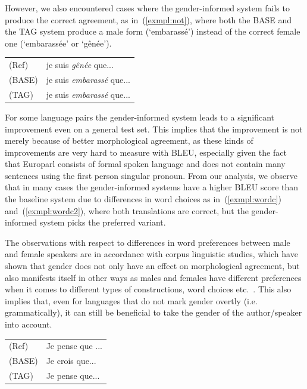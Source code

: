However, we also encountered cases where the gender-informed system fails to produce the correct agreement, as in~(\ref{exmpl:not}), where both the BASE and the TAG system produce a male form (`embarass\'e') instead of the correct female one (`embarass\'ee' or `g\^{e}n\'{e}e'). 

\begin{li}
{\small \centering
\begin{tabular}{ll}
(Ref) & je suis \emph{g\^en\'{e}e} que...\\
(BASE) & je suis \emph{embarass\'{e}} que...\\
(TAG) & je suis \emph{embarass\'{e}} que...\\
\end{tabular}}\label{exmpl:not}
\end{li}

For some language pairs the gender-informed system leads to a significant improvement even on a general test set. This implies that the improvement is not merely because of better morphological agreement, as these kinds of improvements are very hard to measure with BLEU, especially given the fact that Europarl consists of formal spoken language and does not contain many sentences using the first person singular pronoun. From our analysis, we observe that in many cases the gender-informed systems have a higher BLEU score than the baseline system due to differences in word choices as in~(\ref{exmpl:wordc}) and~(\ref{exmpl:wordc2}), where both translations are correct, but the gender-informed system picks the preferred variant.

The observations with respect to differences in word preferences between male and female speakers are in accordance with corpus linguistic studies, which have shown that gender does not only have an effect on morphological agreement, but also manifests itself in other ways as males and females have different preferences when it comes to different types of constructions, word choices etc.~\cite{Newman2008,Coates2015}. This also implies that, even for languages that do not mark gender overtly (i.e. grammatically), it can still be beneficial to take the gender of the author/speaker into account.




\begin{li}
{\small \centering
\begin{tabular}{ll}
(Ref) & Je pense que ...\\
(BASE) & Je crois que...\\
(TAG) & Je pense que...\\
\end{tabular}}\label{exmpl:wordc}
\end{li}

